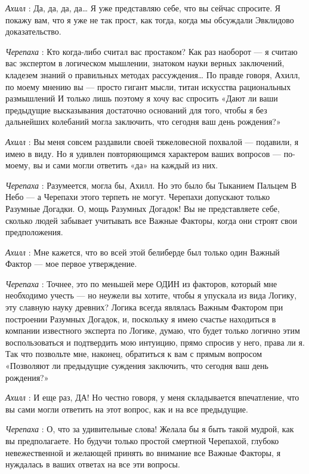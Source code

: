 \documentclass[../main.tex]{subfiles}
\begin{document}
\begin{dialogue}
\emph{Ахилл} : Да, да, да, да\ldots{} Я уже представляю себе, что вы сейчас спросите. Я покажу вам, что я уже не так прост, как тогда, когда мы обсуждали Эвклидово доказательство.

\emph{Черепаха} : Кто когда-либо считал вас простаком? Как раз наоборот --- я считаю вас экспертом в логическом мышлении, знатоком науки верных заключений, кладезем знаний о правильных методах рассуждения\ldots{} По правде говоря, Ахилл, по моему мнению вы --- просто гигант мысли, титан искусства рациональных размышлений И только лишь поэтому я хочу вас спросить «Дают ли ваши предыдущие высказывания достаточно оснований для того, чтобы я без дальнейших колебаний могла заключить, что сегодня ваш день рождения?»

\emph{Ахилл} : Вы меня совсем раздавили своей тяжеловесной похвалой --- подавили, я имею в виду. Но я удивлен повторяющимся характером ваших вопросов --- по-моему, вы и сами могли ответить «да» на каждый из них.

\emph{Черепаха} : Разумеется, могла бы, Ахилл. Но это было бы Тыканием Пальцем В Небо --- а Черепахи этого терпеть не могут. Черепахи допускают только Разумные Догадки. О, мощь Разумных Догадок! Вы не представляете себе, сколько людей забывает учитывать все Важные Факторы, когда они строят свои предположения.

\emph{Ахилл} : Мне кажется, что во всей этой белиберде был только один Важный Фактор --- мое первое утверждение.

\emph{Черепаха} : Точнее, это по меньшей мере ОДИН из факторов, который мне необходимо учесть --- но неужели вы хотите, чтобы я упускала из вида Логику, эту славную науку древних? Логика всегда являлась Важным Фактором при построении Разумных Догадок, и, поскольку я имею счастье находиться в компании известного эксперта по Логике, думаю, что будет только логично этим воспользоваться и подтвердить мою интуицию, прямо спросив у него, права ли я. Так что позвольте мне, наконец, обратиться к вам с прямым вопросом «Позволяют ли предыдущие суждения заключить, что сегодня ваш день рождения?»

\emph{Ахилл} : И еще раз, ДА! Но честно говоря, у меня складывается впечатление, что вы сами могли ответить на этот вопрос, как и на все предыдущие.

\emph{Черепаха} : О, что за удивительные слова! Желала бы я быть такой мудрой, как вы предполагаете. Но будучи только простой смертной Черепахой, глубоко невежественной и желающей принять во внимание все Важные Факторы, я нуждалась в ваших ответах на все эти вопросы.


\end{dialogue}
\end{document}
